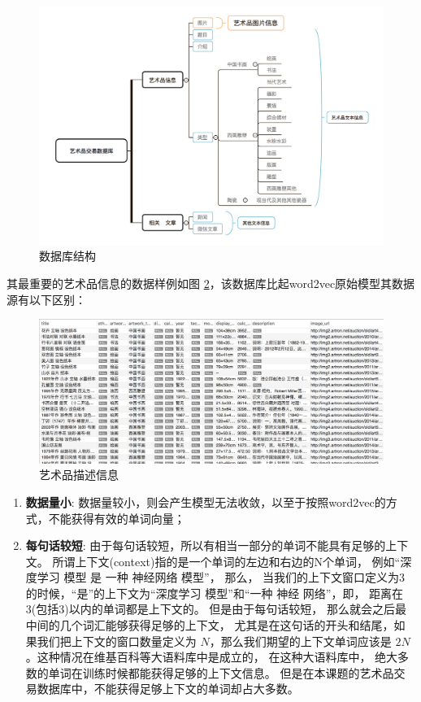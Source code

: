 \begin{figure}[!htbp]
\centering
\includegraphics[width=\linewidth,keepaspectratio]{data/chapter-1/D02BCA18-F339-4988-9E23-E6C5E437BCCA.jpg}
\caption{数据库结构}
\label{figure:数据库结构}
\end{figure}

其最重要的艺术品信息的数据样例如图 \ref{figure:sample-db}，该数据库比起word2vec原始模型其数据源有以下区别： 

\begin{figure}[!htbp]
\centering
\includegraphics[width=\linewidth,keepaspectratio]{data/chapter-1-1/art-description.png}
\caption{艺术品描述信息}
\label{figure:sample-db}
\end{figure}

\begin{enumerate}
\item{\textbf{数据量小}}: 数据量较小，则会产生模型无法收敛，以至于按照word2vec的方式，不能获得有效的单词向量；
\item{\textbf{每句话较短}}: 由于每句话较短，所以有相当一部分的单词不能具有足够的上下文。 所谓上下文(context)指的是一个单词的左边和右边的N个单词， 例如“深度学习 模型 是 一种 神经网络 模型”， 那么， 当我们的上下文窗口定义为3的时候，“是”的上下文为“深度学习 模型”和“一种 神经 网络”，即， 距离在3(包括3)以内的单词都是上下文的。 但是由于每句话较短， 那么就会之后最中间的几个词汇能够获得足够的上下文， 尤其是在这句话的开头和结尾，如果我们把上下文的窗口数量定义为 $N$，那么我们期望的上下文单词应该是 $2N$。这种情况在维基百科等大语料库中是成立的， 在这种大语料库中， 绝大多数的单词在训练时候都能获得足够的上下文信息。 但是在本课题的艺术品交易数据库中，不能获得足够上下文的单词却占大多数。 

\end{enumerate}

